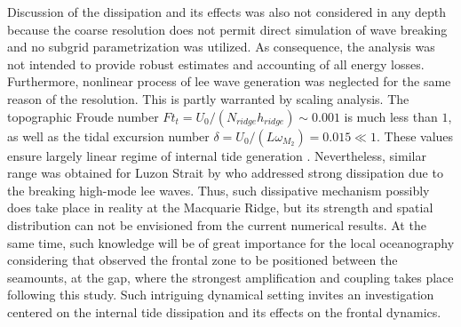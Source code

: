 \documentclass[12pt]{article}
\begin{document}
Discussion of the dissipation and its effects was also not considered in any depth because the 
coarse resolution 
does not permit direct simulation of wave breaking and no subgrid parametrization was utilized. As 
consequence, the analysis was not intended to provide robust estimates and accounting of all 
energy losses. Furthermore, nonlinear process of lee wave generation was neglected for the same 
reason of the resolution. This is partly warranted by scaling analysis. The topographic Froude 
number $Ft_t = 
U_0/(N_{ridge}h_{ridge}) \sim 0.001$ is much less than $1$, as well as the tidal excursion 
number $\delta = U_0/(L \omega_{M_2}) = 0.015 \ll 1$. These values ensure largely 
linear regime of internal tide generation \citep{garrett2007internal}. Nevertheless, similar range 
was obtained for Luzon Strait by \citep{buijsman2012double} who addressed strong dissipation due to 
the breaking high-mode lee waves. Thus, such dissipative mechanism possibly does take place in 
reality 
at the Macquarie Ridge, but its strength and spatial distribution can not be envisioned from the 
current numerical results. At the same time, such knowledge will be of great importance for the 
local oceanography considering that \citep{smith2013interaction} observed the frontal zone to be 
positioned between the seamounts, at the gap, where the strongest amplification and coupling takes 
place following this study. Such intriguing dynamical setting invites an investigation centered on 
the internal tide dissipation and its effects on the frontal dynamics.
\end{document}
